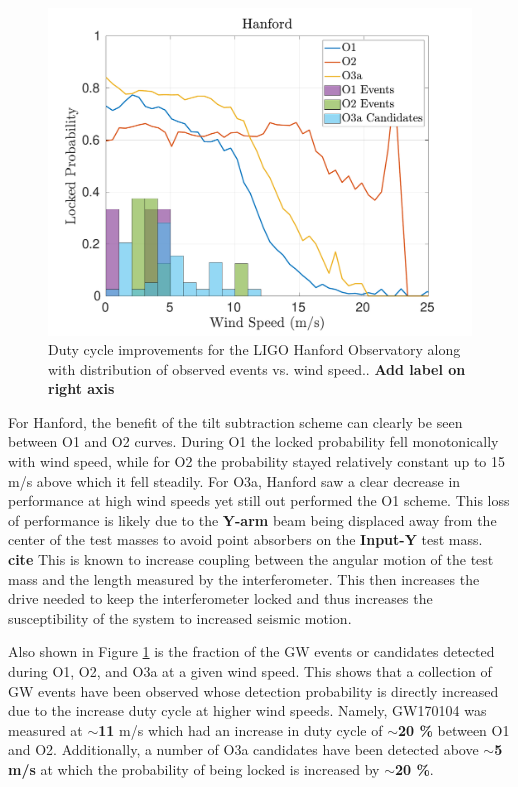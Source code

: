 \documentclass [12pt, proquest]{uwthesis}[2019]
\begin{document}
\begin{figure}%
\begin{center}
\includegraphics[width=\textwidth]{LHO_WindVsLockEvents.pdf}
\caption[Duty cycle improvements for the LIGO Hanford Observatory]{Duty cycle improvements for the LIGO Hanford Observatory along with distribution of observed events vs. wind speed.. \textbf{Add label on right axis}}
\label{LHO_events}
\end{center}
\end{figure}

For Hanford, the benefit of the tilt subtraction scheme can clearly be seen between O1 and O2 curves. During O1 the locked probability fell monotonically with wind speed, while for O2 the probability stayed relatively constant up to 15 m/s above which it fell steadily. For O3a, Hanford saw a clear decrease in performance at high wind speeds yet still out performed the O1 scheme. This loss of performance is likely due to the \textbf{Y-arm} beam being displaced away from the center of the test masses to avoid point absorbers on the \textbf{Input-Y} test mass. \textbf{cite} This is known to increase coupling between the angular motion of the test mass and the length measured by the interferometer. This then increases the drive needed to keep the interferometer locked and thus increases the susceptibility of the system to increased seismic motion. 

Also shown in Figure \ref{LHO_events} is the fraction of the GW events or candidates detected during O1, O2, and O3a at a given wind speed. This shows that a collection of GW events have been observed whose detection probability is directly increased due to the increase duty cycle at higher wind speeds. Namely, GW170104 was measured at $\sim$\textbf{11} m/s which had an increase in duty cycle of $\sim$\textbf{20 \%} between O1 and O2. Additionally, a number of O3a candidates have been detected above $\sim$\textbf{5 m/s} at which the probability of being locked is increased by $\sim$\textbf{20 \%}.
\end{document}
